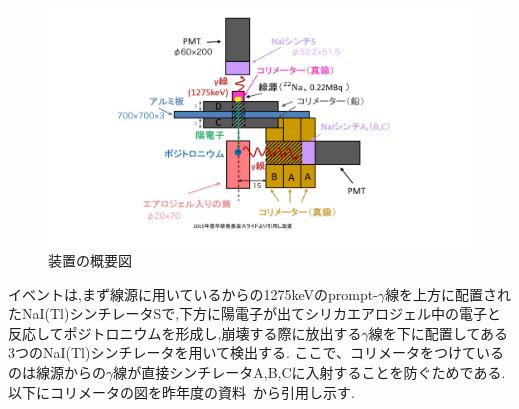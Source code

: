 \begin{figure}[H]
	\centering
		\includegraphics[width=15cm]{fig/isb/settings.pdf}
		\caption{装置の概要図}
		\label{fig:setting_dtl2015}
\end{figure}

イベントは,まず線源に用いているからの1275keVのprompt-$\gamma$線を上方に配置されたNaI(Tl)シンチレータSで,下方に陽電子が出てシリカエアロジェル中の電子と反応してポジトロニウムを形成し,崩壊する際に放出する$\gamma$線を下に配置してある3つのNaI(Tl)シンチレータを用いて検出する.
ここで、コリメータをつけているのは線源からの$\gamma$線が直接シンチレータA,B,Cに入射することを防ぐためである.
以下にコリメータの図を昨年度の資料~\cite{卒業発表2015}から引用し示す.


